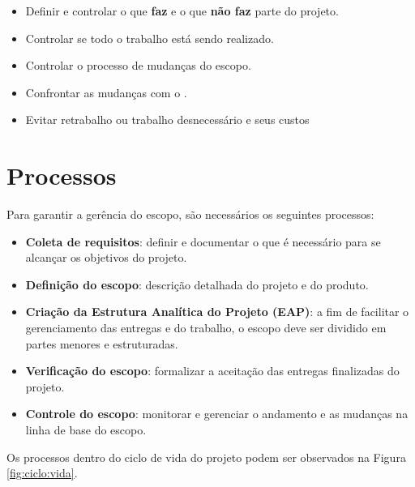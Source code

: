 \begin{itemize}

\item Definir e controlar o que \textbf{faz} e o que \textbf{não faz} parte do projeto.

\item Controlar se todo o trabalho está sendo realizado.

\item Controlar o processo de mudanças do escopo.

\item Confrontar as mudanças com o \termo.

\item Evitar retrabalho ou trabalho desnecessário e seus custos

\end{itemize}

\section{Processos}

Para garantir a gerência do escopo, são necessários os seguintes processos:

\begin{itemize}

\item \textbf{Coleta de requisitos}: definir e documentar o que é necessário para se alcançar os objetivos do projeto.

\item \textbf{Definição do escopo}: descrição detalhada do projeto e do produto.

\item \textbf{Criação da Estrutura Analítica do Projeto (EAP)}: a fim de facilitar o gerenciamento das entregas e do trabalho, o escopo deve ser dividido em partes menores e estruturadas.

\item \textbf{Verificação do escopo}: formalizar a aceitação das entregas finalizadas do projeto.

\item \textbf{Controle do escopo}: monitorar e gerenciar o andamento e as mudanças na linha de base do escopo.

\end{itemize}

Os processos dentro do ciclo de vida do projeto podem ser observados na Figura \ref{fig:ciclo:vida}.

